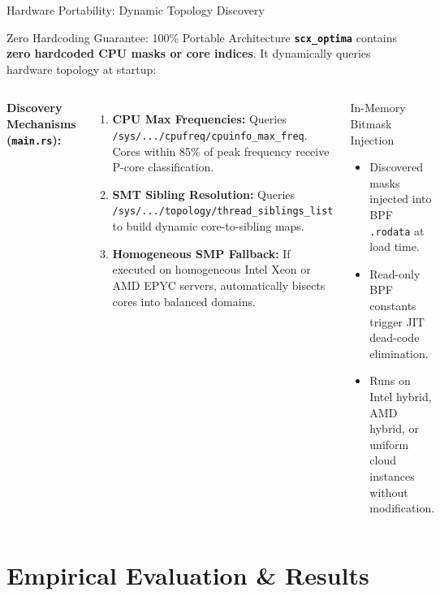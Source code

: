\documentclass{beamer}
\begin{document}
\begin{frame}{Hardware Portability: Dynamic Topology Discovery}
  \begin{alertblock}{Zero Hardcoding Guarantee: 100\% Portable Architecture}
    \footnotesize
    \textbf{\texttt{scx\_optima}} contains \textbf{zero hardcoded CPU masks or core indices}. It dynamically queries hardware topology at startup:
  \end{alertblock}

  \vspace{0.15cm}
  \begin{columns}[T]
      \textbf{Discovery Mechanisms (\texttt{main.rs}):}
      \begin{enumerate}\itemsep2pt\tiny
        \item \textbf{CPU Max Frequencies:} Queries \texttt{/sys/.../cpufreq/cpuinfo\_max\_freq}. Cores within 85\% of peak frequency receive P-core classification.
        \item \textbf{SMT Sibling Resolution:} Queries \texttt{/sys/.../topology/thread\_siblings\_list} to build dynamic core-to-sibling maps.
        \item \textbf{Homogeneous SMP Fallback:} If executed on homogeneous Intel Xeon or AMD EPYC servers, automatically bisects cores into balanced domains.
      \end{enumerate}

      \begin{block}{\small In-Memory Bitmask Injection}
        \scriptsize
        \begin{itemize}\itemsep2pt\tiny
          \item Discovered masks injected into BPF \texttt{.rodata} at load time.
          \item Read-only BPF constants trigger JIT dead-code elimination.
          \item Runs on Intel hybrid, AMD hybrid, or uniform cloud instances without modification.
        \end{itemize}
      \end{block}
  \end{columns}
\end{frame}

\section{Empirical Evaluation \& Results}
\end{document}
